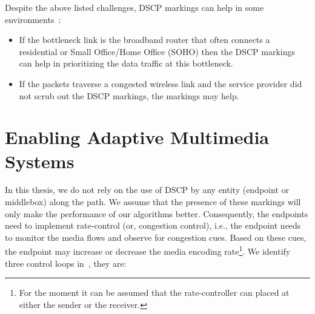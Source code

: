 

Despite the above listed challenges, DSCP markings can help in some
environments~\cite{draft.rtcweb.qos}:

\begin{itemize}
	
    \item If the bottleneck link is the broadband router that often connects a
    residential or Small Office/Home Office (SOHO) then the DSCP markings can 
    help in prioritizing the data traffic at this bottleneck.

	\item If the packets traverse a congested wireless link and the service 
	provider did not scrub out the DSCP markings, the markings may help.

\end{itemize}

\section{Enabling Adaptive Multimedia Systems}

In this thesis, we do not rely on the use of DSCP by any entity (endpoint or
middlebox) along the path. We assume that the presence of these markings will
only make the performance of our algorithms better. Consequently, the
endpoints need to implement rate-control (or, congestion control), i.e., the
endpoint needs to monitor the media flows and observe for congestion cues.
Based on these cues, the endpoint may increase or decrease the media encoding
rate\footnote{For the moment it can be assumed that the rate-controller can
placed at either the sender or the receiver.}. We identify three control loops
in~\cite{Singh:control.loops.api}, they are:


